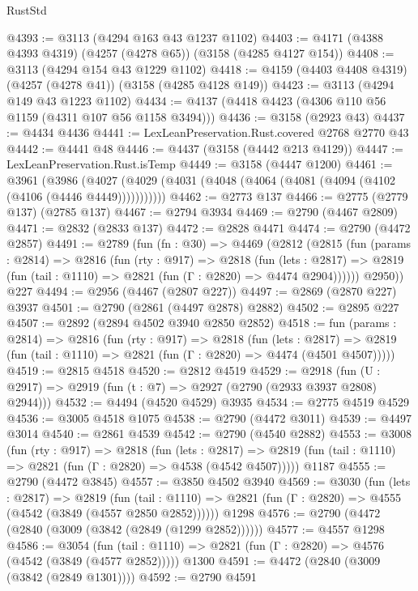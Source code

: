 \begin{lexlean}{RustStd}
\begin{coremodule}
{\begin{coremodule}
{{{{{{{{{{{{{{{{{{{{{{{{{{@4393 := @3113 (@4294 @163 @43 @1237 @1102)
@4403 := @4171 (@4388 @4393 @4319) (@4257 (@4278 @65)) (@3158 (@4285 @4127 @154))
@4408 := @3113 (@4294 @154 @43 @1229 @1102)
@4418 := @4159 (@4403 @4408 @4319) (@4257 (@4278 @41)) (@3158 (@4285 @4128 @149))
@4423 := @3113 (@4294 @149 @43 @1223 @1102)
@4434 := @4137 (@4418 @4423 (@4306 @110 @56 @1159 (@4311 @107 @56 @1158 @3494)))
@4436 := @3158 (@2923 @43)
@4437 := @4434 @4436
@4441 := LexLeanPreservation.Rust.covered @2768 @2770 @43
@4442 := @4441 @48
@4446 := @4437 (@3158 (@4442 @213 @4129))
@4447 := LexLeanPreservation.Rust.isTemp
@4449 := @3158 (@4447 @1200)
@4461 := @3961
    (@3986 (@4027 (@4029 (@4031 (@4048 (@4064 (@4081 (@4094 (@4102 (@4106 (@4446 @4449)))))))))))
@4462 := @2773 @137
@4466 := @2775 (@2779 @137) (@2785 @137)
@4467 := @2794 @3934
@4469 := @2790 (@4467 @2809)
@4471 := @2832 (@2833 @137)
@4472 := @2828 @4471
@4474 := @2790 (@4472 @2857)
@4491 := @2789
    (fun (fn : @30) =>
    @4469
      (@2812
        (@2815
          (fun (params : @2814) =>
          @2816
            (fun (rty : @917) =>
            @2818
              (fun (lets : @2817) =>
              @2819 (fun (tail : @1110) => @2821 (fun (Γ : @2820) => @4474 @2904))))))
        @2950))
    @227
@4494 := @2956 (@4467 (@2807 @227))
@4497 := @2869 (@2870 @227) @3937
@4501 := @2790 (@2861 (@4497 @2878) @2882)
@4502 := @2895 @227
@4507 := @2892 (@2894 @4502 @3940 @2850 @2852)
@4518 := fun (params : @2814) =>
  @2816
    (fun (rty : @917) =>
    @2818
      (fun (lets : @2817) =>
      @2819 (fun (tail : @1110) => @2821 (fun (Γ : @2820) => @4474 (@4501 @4507)))))
@4519 := @2815 @4518
@4520 := @2812 @4519
@4529 := @2918 (fun (U : @2917) => @2919 (fun (t : @7) => @2927 (@2790 (@2933 @3937 @2808) @2944)))
@4532 := @4494 (@4520 @4529) @3935
@4534 := @2775 @4519 @4529
@4536 := @3005 @4518 @1075
@4538 := @2790 (@4472 @3011)
@4539 := @4497 @3014
@4540 := @2861 @4539
@4542 := @2790 (@4540 @2882)
@4553 := @3008
    (fun (rty : @917) =>
    @2818
      (fun (lets : @2817) =>
      @2819 (fun (tail : @1110) => @2821 (fun (Γ : @2820) => @4538 (@4542 @4507)))))
    @1187
@4555 := @2790 (@4472 @3845)
@4557 := @3850 @4502 @3940
@4569 := @3030
    (fun (lets : @2817) =>
    @2819
      (fun (tail : @1110) => @2821 (fun (Γ : @2820) => @4555 (@4542 (@3849 (@4557 @2850 @2852))))))
    @1298
@4576 := @2790 (@4472 (@2840 (@3009 (@3842 (@2849 (@1299 @2852))))))
@4577 := @4557 @1298
@4586 := @3054
    (fun (tail : @1110) => @2821 (fun (Γ : @2820) => @4576 (@4542 (@3849 (@4577 @2852)))))
    @1300
@4591 := @4472 (@2840 (@3009 (@3842 (@2849 @1301))))
@4592 := @2790 @4591
}}}}}}}}}}}}}}}}}}}}}}}}}}
\end{coremodule}}
\end{coremodule}
\end{lexlean}
